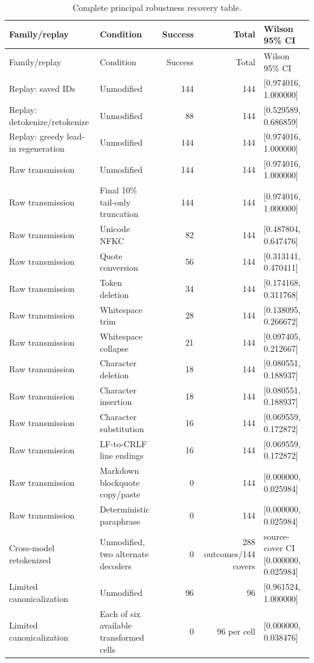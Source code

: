 \documentclass[fleqn,10pt]{wlscirep}
\begin{document}
\setlength{\tabcolsep}{3pt}
\begin{longtable}{L{0.20\textwidth}L{0.22\textwidth}r r L{0.18\textwidth}}
\caption{\label{tab:robustness}Complete principal robustness recovery table.}\\
\toprule
Family/replay & Condition & Success & Total & Wilson 95\% CI \\
\midrule
\endfirsthead
\toprule
Family/replay & Condition & Success & Total & Wilson 95\% CI \\
\midrule
\endhead
Replay: saved IDs & Unmodified & 144 & 144 & [0.974016, 1.000000] \\
Replay: detokenize/retokenize & Unmodified & 88 & 144 & [0.529589, 0.686859] \\
Replay: greedy lead-in regeneration & Unmodified & 144 & 144 & [0.974016, 1.000000] \\
Raw transmission & Unmodified & 144 & 144 & [0.974016, 1.000000] \\
Raw transmission & Final 10\% tail-only truncation & 144 & 144 & [0.974016, 1.000000] \\
Raw transmission & Unicode NFKC & 82 & 144 & [0.487804, 0.647476] \\
Raw transmission & Quote conversion & 56 & 144 & [0.313141, 0.470411] \\
Raw transmission & Token deletion & 34 & 144 & [0.174168, 0.311768] \\
Raw transmission & Whitespace trim & 28 & 144 & [0.138095, 0.266672] \\
Raw transmission & Whitespace collapse & 21 & 144 & [0.097405, 0.212667] \\
Raw transmission & Character deletion & 18 & 144 & [0.080551, 0.188937] \\
Raw transmission & Character insertion & 18 & 144 & [0.080551, 0.188937] \\
Raw transmission & Character substitution & 16 & 144 & [0.069559, 0.172872] \\
Raw transmission & LF-to-CRLF line endings & 16 & 144 & [0.069559, 0.172872] \\
Raw transmission & Markdown blockquote copy/paste & 0 & 144 & [0.000000, 0.025984] \\
Raw transmission & Deterministic paraphrase & 0 & 144 & [0.000000, 0.025984] \\
Cross-model retokenized & Unmodified, two alternate decoders & 0 & 288 outcomes/144 covers & source-cover CI [0.000000, 0.025984] \\
Limited canonicalization & Unmodified & 96 & 96 & [0.961524, 1.000000] \\
Limited canonicalization & Each of six available transformed cells & 0 & 96 per cell & [0.000000, 0.038476] \\
\bottomrule
\end{longtable}
\end{document}
